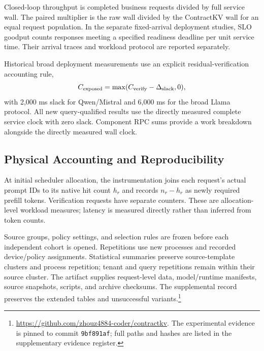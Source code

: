 Closed-loop throughput is completed business requests divided by full service wall. The paired multiplier is the raw wall divided by the ContractKV wall for an equal request population. In the separate fixed-arrival deployment studies, SLO goodput counts responses meeting a specified readiness deadline per unit service time. Their arrival traces and workload protocol are reported separately.

Historical broad deployment measurements use an explicit residual-verification accounting rule,
\begin{equation}
 C_{\rm exposed}=\max(C_{\rm verify}-\Delta_{\rm slack},0),
\label{eq:slack}
\end{equation}
with 2,000 ms slack for Qwen/Mistral and 6,000 ms for the broad Llama protocol. All new query-qualified results use the directly measured complete service clock with zero slack. Component RPC sums provide a work breakdown alongside the directly measured wall clock.

\subsection{Physical Accounting and Reproducibility}
At initial scheduler allocation, the instrumentation joins each request's actual prompt IDs to its native hit count $h_r$ and records $n_r-h_r$ as newly required prefill tokens. Verification requests have separate counters. These are allocation-level workload measures; latency is measured directly rather than inferred from token counts.

Source groups, policy settings, and selection rules are frozen before each independent cohort is opened. Repetitions use new processes and recorded device/policy assignments. Statistical summaries preserve source-template clusters and process repetition; tenant and query repetitions remain within their source cluster. The artifact supplies request-level data, model/runtime manifests, source snapshots, scripts, and archive checksums. The supplemental record preserves the extended tables and unsuccessful variants.\footnote{\url{https://github.com/zhouz4884-coder/contractkv}. The experimental evidence is pinned to commit \texttt{9bf891af}; full paths and hashes are listed in the supplementary evidence register.}
